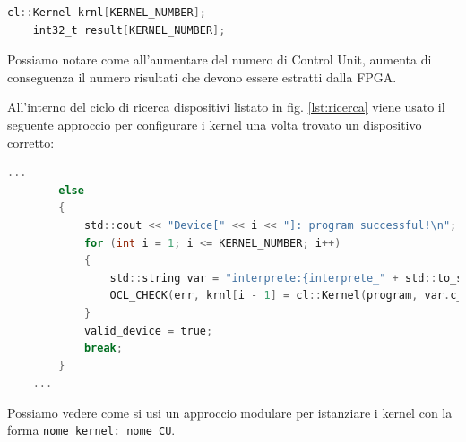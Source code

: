 \begin{lstlisting}[language=C]
	cl::Kernel krnl[KERNEL_NUMBER];
	int32_t result[KERNEL_NUMBER];
\end{lstlisting}

Possiamo notare come all'aumentare del numero di Control Unit, aumenta di conseguenza il numero risultati che devono essere estratti dalla FPGA.

All'interno del ciclo di ricerca dispositivi listato in fig. \ref{lst:ricerca} viene usato il seguente approccio per configurare i kernel una volta trovato un dispositivo corretto: 
\begin{lstlisting}[language=C]
    ...
		else
		{
			std::cout << "Device[" << i << "]: program successful!\n";
			for (int i = 1; i <= KERNEL_NUMBER; i++)
			{
				std::string var = "interprete:{interprete_" + std::to_string(i) + "}";
				OCL_CHECK(err, krnl[i - 1] = cl::Kernel(program, var.c_str(), &err));
			}
			valid_device = true;
			break;
		}
    ...
\end{lstlisting}
Possiamo vedere come si usi un approccio modulare per istanziare i kernel con la forma \texttt{nome kernel: nome CU}.

